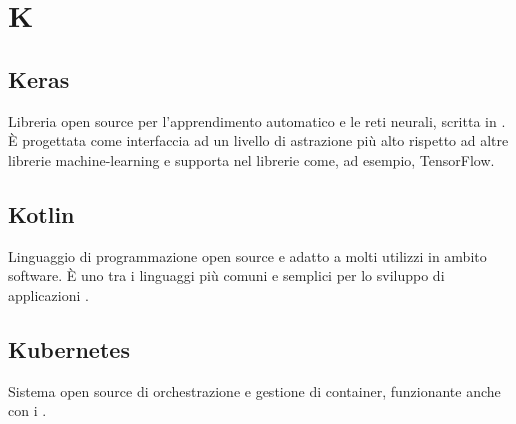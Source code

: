 \section*{K}
\markright{}
\subsection*{Keras}
Libreria open source per l'apprendimento automatico e le reti neurali, scritta in . È progettata come interfaccia ad un livello di astrazione più alto rispetto ad altre librerie machine-learning e supporta nel  librerie come, ad esempio, TensorFlow.

\subsection*{Kotlin}
Linguaggio di programmazione open source e adatto a molti utilizzi in ambito software. È uno tra i linguaggi più comuni e semplici per lo sviluppo di applicazioni .  

\subsection*{Kubernetes}
Sistema open source di orchestrazione e gestione di container, funzionante anche con i .